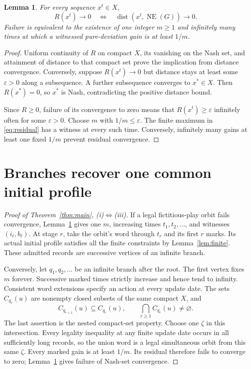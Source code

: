 \documentclass[11pt,a4paper]{article}
\newtheorem{lemma}[theorem]{Lemma}
\theoremstyle{definition}
\DeclareMathOperator{\NE}{NE}
\DeclareMathOperator{\dist}{dist}
\begin{document}
\begin{lemma}\label{lem:distance}
For every sequence $x^t\in X$,
\begin{equation}\label{eq:distance}
 R(x^t)\longrightarrow0
 \quad\Longleftrightarrow\quad
 \dist(x^t,\NE(G))\longrightarrow0.
\end{equation}
Failure is equivalent to the existence of one integer $m\ge1$ and
infinitely many times at which a witnessed pure-deviation gain is at least
$1/m$.
\end{lemma}

\begin{proof}
Uniform continuity of $R$ on compact $X$, its vanishing on the Nash set,
and attainment of distance to that compact set prove the implication from
distance convergence. Conversely, suppose $R(x^t)\to0$ but distance
stays at least some $\varepsilon>0$ along a subsequence. A further
subsequence converges to $x^*\in X$. Then $R(x^*)=0$, so $x^*$ is Nash,
contradicting the positive distance bound.

Since $R\ge0$, failure of its convergence to zero means that
$R(x^t)\ge\varepsilon$ infinitely often for some $\varepsilon>0$.
Choose $m$ with $1/m\le\varepsilon$. The finite maximum in
\eqref{eq:residual} has a witness at every such time. Conversely, infinitely
many gains at least one fixed $1/m$ prevent residual convergence.
\end{proof}

\section{Branches recover one common initial profile}

\begin{proof}[Proof of Theorem~\ref{thm:main}, \textup{(i)}$\Leftrightarrow$\textup{(iii)}]
If a legal fictitious-play orbit fails convergence, Lemma~\ref{lem:distance}
gives one $m$, increasing times $t_1,t_2,\ldots$, and witnesses
$(i_\ell,b_\ell)$. At stage $r$, take the orbit's word through $t_r$
and its first $r$ marks. Its actual initial profile satisfies all the finite
constraints by Lemma~\ref{lem:finite}. These admitted records are successive
vertices of an infinite branch.

Conversely, let $q_1,q_2,\ldots$ be an infinite branch after the root.
The first vertex fixes $m$ forever. Successive marked times strictly
increase and hence tend to infinity. Consistent word extensions specify
an action at every update date. The sets $C_{q_r}(u)$ are nonempty closed
subsets of the same compact $X$, and
\begin{equation}\label{eq:intersection}
 C_{q_{r+1}}(u)\subseteq C_{q_r}(u),\qquad
 \bigcap_{r\ge1}C_{q_r}(u)\ne\varnothing.
\end{equation}
The last assertion is the nested compact-set property. Choose one
$\zeta$ in this intersection. Every legality inequality at any finite
update date occurs in all sufficiently long records, so the union word
is a legal simultaneous orbit from this same $\zeta$. Every marked gain
is at least $1/m$. Its residual therefore fails to converge to zero;
Lemma~\ref{lem:distance} gives failure of Nash-set convergence.
\end{proof}
\end{document}

